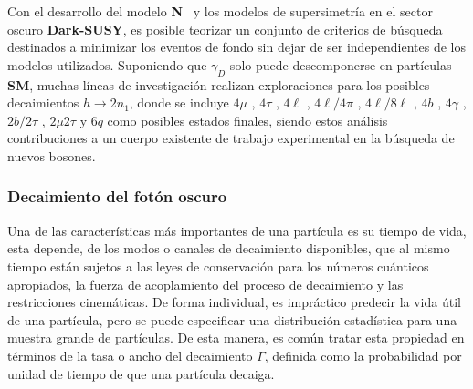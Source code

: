 Con el desarrollo del modelo \textbf{N}\MSSM ~ y los modelos de supersimetría en el sector oscuro \textbf{Dark-SUSY}, es posible teorizar un conjunto de criterios de búsqueda destinados a minimizar los eventos de fondo sin dejar de ser independientes de los modelos utilizados. Suponiendo que $\gamma_D$ solo puede descomponerse en partículas \textbf{SM}, %
muchas líneas de investigación realizan exploraciones para los posibles decaimientos $h \rightarrow 2n_1$, donde se incluye $4\mu$ \citep{cms_collaboration_search_2016,cms_collaboration_search_2013}
, $4\tau$ %
, $4\ell$ \citep{cms_collaboration_search_2018,lhcb_collaboration_search_2016}
, $4\ell/4\pi$ \citep{cms_collaboration_search_2018}
, $4\ell/8\ell$ \citep{atlas_collaboration_search_2016-2}
, $4b$ \citep{atlas_collaboration_search_2018-1,atlas_collaboration_search_2016-3}
, $4\gamma$ \citep{atlas_collaboration_search_2014}
, $2b/2\tau$ \citep{atlas_collaboration_search_2018-2}
, $2\mu 2\tau$ \citep{atlas_collaboration_search_2015}
y $6q$ \citep{cms_collaboration_search_2016} 
como posibles estados finales, siendo estos análisis contribuciones a un cuerpo existente de trabajo experimental en la búsqueda de nuevos bosones.

\subsubsection{Decaimiento del fotón oscuro}

Una de las características más importantes de una partícula es su tiempo de vida, esta depende, de los modos o canales de decaimiento disponibles, que al mismo tiempo están sujetos a las leyes de conservación para los números cuánticos apropiados, la fuerza de acoplamiento del proceso de decaimiento y las restricciones cinemáticas. De forma individual, es impráctico predecir la vida útil de una partícula, pero se puede especificar una distribución estadística para una muestra grande de partículas. De esta manera, es común tratar esta propiedad en términos de la tasa o ancho del decaimiento $\Gamma$, definida como la probabilidad por unidad de tiempo de que una partícula decaiga. 

